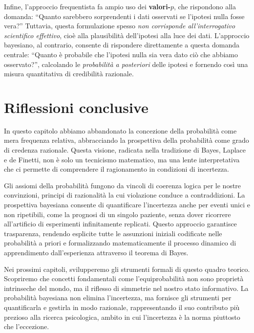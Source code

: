 \documentclass[
  letterpaper,
  DIV=11,
  numbers=noendperiod,
  oneside]{scrreprt}
\theoremstyle{definition}
\theoremstyle{plain}
\theoremstyle{definition}
\theoremstyle{remark}
\begin{document}
Infine, l'approccio frequentista fa ampio uso dei \textbf{valori-\(p\)},
che rispondono alla domanda: ``Quanto sarebbero sorprendenti i dati
osservati se l'ipotesi nulla fosse vera?'' Tuttavia, questa formulazione
spesso \emph{non corrisponde all'interrogativo scientifico effettivo},
cioè alla plausibilità dell'ipotesi alla luce dei dati. L'approccio
bayesiano, al contrario, consente di rispondere direttamente a questa
domanda centrale: ``Quanto è probabile che l'ipotesi nulla sia vera dato
ciò che abbiamo osservato?'', calcolando le \emph{probabilità a
posteriori} delle ipotesi e fornendo così una misura quantitativa di
credibilità razionale.

\section*{Riflessioni conclusive}\label{riflessioni-conclusive}


In questo capitolo abbiamo abbandonato la concezione della probabilità
come mera frequenza relativa, abbracciando la prospettiva della
probabilità come grado di credenza razionale. Questa visione, radicata
nella tradizione di Bayes, Laplace e de Finetti, non è solo un
tecnicismo matematico, ma una lente interpretativa che ci permette di
comprendere il ragionamento in condizioni di incertezza.

Gli assiomi della probabilità fungono da vincoli di coerenza logica per
le nostre convinzioni, principi di razionalità la cui violazione conduce
a contraddizioni. La prospettiva bayesiana consente di quantificare
l'incertezza anche per eventi unici e non ripetibili, come la prognosi
di un singolo paziente, senza dover ricorrere all'artificio di
esperimenti infinitamente replicati. Questo approccio garantisce
trasparenza, rendendo esplicite tutte le assunzioni iniziali codificate
nelle probabilità a priori e formalizzando matematicamente il processo
dinamico di apprendimento dall'esperienza attraverso il teorema di
Bayes.

Nei prossimi capitoli, svilupperemo gli strumenti formali di questo
quadro teorico. Scopriremo che concetti fondamentali come
l'equiprobabilità non sono proprietà intrinseche del mondo, ma il
riflesso di simmetrie nel nostro stato informativo. La probabilità
bayesiana non elimina l'incertezza, ma fornisce gli strumenti per
quantificarla e gestirla in modo razionale, rappresentando il suo
contributo più prezioso alla ricerca psicologica, ambito in cui
l'incertezza è la norma piuttosto che l'eccezione.
\end{document}
